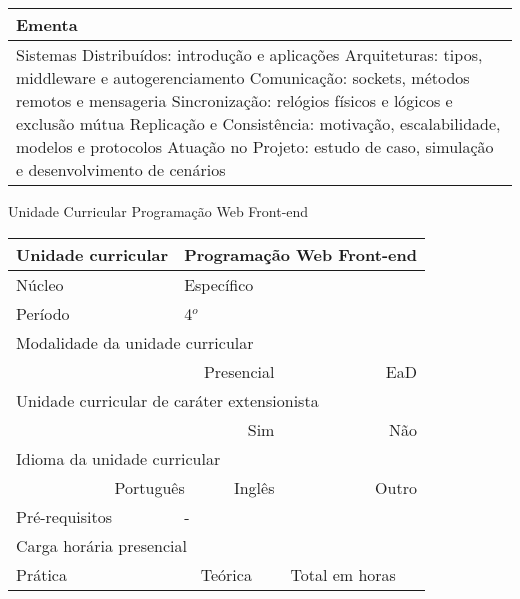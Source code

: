 \begin{quadro}[h!]
\begin{tabular}{|p{3cm} p{2cm} p{3cm} p{2cm} p{3cm} p{2cm}|}
\multicolumn{6}{|p{15cm}|}{\cellcolor{blue1} Ementa} \\\hline
\hline\multicolumn{6}{|p{15cm}|}{\scriptsize Sistemas Distribuídos: introdução e aplicações Arquiteturas: tipos, middleware e autogerenciamento Comunicação: sockets, métodos remotos e mensageria Sincronização: relógios físicos e lógicos e exclusão mútua Replicação e Consistência: motivação, escalabilidade, modelos e protocolos Atuação no Projeto: estudo de caso, simulação e desenvolvimento de cenários}\\\hline
\hline
	\end{tabular}
\end{quadro}
\begin{quadro}[h!]
  \centering\scriptsize
\caption{Unidade Curricular Programação Web Front-end}
\label{ unit_20 }
\begin{tabular}{|p{3cm} p{2cm} p{3cm} p{2cm} p{3cm} p{2cm}|}\hline
\multicolumn{1}{|p{3cm}|}{\cellcolor{blue1} Unidade curricular} & \multicolumn{5}{p{9cm}|}{ Programação Web Front-end }\\\hline
\multicolumn{1}{|p{3cm}|}{\cellcolor{blue1} Núcleo} & \multicolumn{5}{p{11.5cm}|}{ Específico }\\\hline
\multicolumn{1}{|p{3cm}|}{\cellcolor{blue1} Período} & \multicolumn{5}{p{9cm}|}{ 4$^o$ }\\\hline
\multicolumn{6}{|p{15cm}|}{\cellcolor{blue1} Modalidade da unidade curricular} \\\hline
\multicolumn{2}{|r}{		} &  \multicolumn{2}{r}{Presencial \XBox } & \multicolumn{2}{r|}{EaD \Square	} \\\hline
\multicolumn{6}{|p{15cm}|}{\cellcolor{blue1} Unidade curricular de caráter extensionista} \\\hline
\multicolumn{4}{|r}{			Sim \Square	} & \multicolumn{2}{r|}{	Não \XBox	}\\\hline
\multicolumn{6}{|p{15cm}|}{\cellcolor{blue1} Idioma da unidade curricular} \\ \hline
\multicolumn{2}{|r}{	Português \XBox	} &  \multicolumn{2}{r}{	Inglês \Square	} & \multicolumn{2}{r|}{	Outro \Square	} \\ \hline
\multicolumn{1}{|p{3cm}|}{\cellcolor{blue1} Pré-requisitos} & \multicolumn{5}{p{9cm}|}{ - }\\ \hline
\multicolumn{6}{|p{15cm}|}{\cellcolor{blue1} Carga horária presencial} \\ \hline
\multicolumn{1}{|p{3cm}|}{\raggedleft Prática} & \multicolumn{1}{p{1cm}|}{\centering	30	} &  \multicolumn{1}{p{3cm}|}{\raggedleft Teórica}  & \multicolumn{1}{p{1cm}|}{\centering 	30 } & \multicolumn{1}{p{3cm}|}{\raggedleft Total em horas} & \multicolumn{1}{p{1cm}|}{\raggedleft	60	} \\ \hline

\end{tabular}
\end{quadro}
